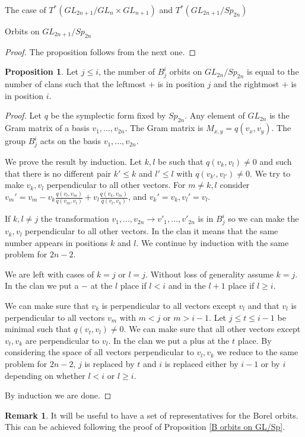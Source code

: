 \documentclass[12pt]{article}
\theoremstyle{plain}
\theoremstyle{definition}
\newtheorem{prop}[theorem]{Proposition}
\newtheorem{Remark}[theorem]{Remark}
\begin{document}
\begin{subsection}{The case of $T^*(GL_{2n+1}/GL_n\times GL_{n+1})$ and $T^*(GL_{2n+1}/Sp_{2n})$}
\begin{subsubsection}{Orbits on $GL_{2n+1}/Sp_{2n}$}
\begin{proof}
The proposition follows from the next one.

\end{proof}

\begin{prop}
    Let $j\leq i$, the number of $B^i_j$ orbits on $GL_{2n}/Sp_{2n}$ is equal to the number of clans such that the leftmost $+$ is in position $j$ and the rightmost $+$ is in position $i$.
\end{prop}

\begin{proof}
    Let $q$ be the symplectic form fixed by $Sp_{2n}$. Any element of $GL_{2n}$ is the Gram matrix of a basis $v_1,...,v_{2n}$. The Gram matrix is $M_{x,y}=q(v_x,v_y)$. The group $B^i_j$ acts on the basis $v_1,...,v_{2n}$.

    We prove the result by induction. Let $k,l$ be such that $q(v_k,v_l)\neq 0$ and such that there is no different pair $k'\leq k$ and $l'\leq l$ with $q(v_{k'},v_{l'})\neq 0$. We try to make $v_k,v_l$ perpendicular to all other vectors. For $m\neq k,l$ consider
    $v_m'=v_m-v_k\frac{q(v_l,v_m)}{q(v_m,v_l)}+v_l\frac{q(v_k,v_m)}{q(v_l,v_k)}$, and $v_k'=v_k,v_l'=v_l$. 
    
    If $k,l\neq j$ the transformation $v_1,...,v_{2n}\rightarrow v'_1,...,v'_{2n}$ is in $B^i_j$ so we can make the $v_k,v_l$ perpendicular to all other vectors. In the clan it means that the same number appears in positions $k$ and $l$. We continue by induction with the same problem for $2n-2$.

    We are left with cases of $k=j$ or $l=j$. Without loss of generality assume $k=j$. In the clan we put a $-$ at the $l$ place if $l<i$ and in the $l+1$ place if $l\geq i$. 

    We can make sure that $v_k$ is perpendicular to all vectors except $v_l$ and that $v_l$ is perpendicular to all vectors $v_m$ with $m<j$ or $m>i-1$. Let $j\leq t\leq i-1$ be minimal such that $q(v_t,v_l)\neq 0$. We can make sure that all other vectors except $v_t,v_k$ are perpendicular to $v_l$. In the clan we put a plus at the $t$ place. By considering the space of all vectors perpendicular to $v_l,v_k$ we reduce to the same problem for $2n-2$, $j$ is replaced by $t$ and $i$ is replaced either by $i-1$ or by $i$ depending on whether $l<i$ or $l\geq i$. 

    By induction we are done.
    
\end{proof}

 \begin{Remark}\label{rem:sp_represntatives}
        It will be useful to have a set of representatives for the Borel orbits. This can be achieved following the proof of Proposition \ref{B orbits on GL/Sp}.
        

\end{Remark}
\end{subsubsection}
\end{subsection}
\end{document}
